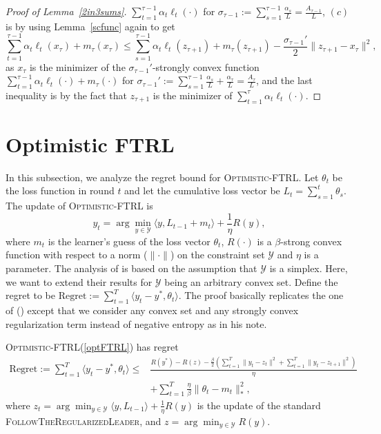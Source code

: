 \documentclass[pmlr]{jmlr} %
\def\FTRL{\textsc{FollowTheRegularizedLeader}\xspace}
\def\OFTRL{\textsc{Optimistic-FTRL}\xspace}
\newcommand{\YY}{\mathcal{Y}}
\begin{document}
\begin{proof}[Proof of Lemma~\ref{2in3sums}]
$\sum_{t=1}^{\tau-1}\alpha_{t} \ell_{t} (\cdot) $ for $\sigma_{\tau-1} := \sum_{s=1}^{\tau-1}\frac{\alpha_{s}}{L} = \frac{A_{\tau-1}}{L}$,
$(c)$ is by using Lemma~\ref{scfunc} again to get
\begin{equation}
 \sum_{t=1}^{\tau-1} \alpha_{t} \ell_{t} (x_{\tau}) + m_{\tau}(x_{\tau}) \leq  \sum_{s=1}^{\tau-1}\alpha_{t} \ell_{t} (z_{\tau+1}) +m_{\tau}(z_{\tau+1}) - \frac{\sigma_{\tau-1}'}{2} \| z_{\tau+1} - x_{\tau}\|^{2},
\end{equation}
as $x_{\tau}$ is the minimizer of the $\sigma_{\tau-1}'$-strongly convex function
$\sum_{t=1}^{\tau-1}\alpha_{t} \ell_{t} (\cdot) + m_{\tau}(\cdot)$ for $\sigma_{\tau-1}':= \sum_{s=1}^{\tau-1}\frac{\alpha_{s}}{L} + \frac{\alpha_{\tau}}{L}= \frac{A_{\tau}}{L}$,
and the last inequality is by the fact that $z_{\tau+1}$ is the minimizer of
$\sum_{t=1}^{\tau}\alpha_{t} \ell_{t} (\cdot) $.
\end{proof}



\section{Optimistic FTRL} \label{app:optFTRL}
In this subsection, we analyze the regret bound for \OFTRL.
Let $\theta_{t}$ be the loss function in round $t$ and let the cumulative loss vector be
$L_{t} = \sum_{s=1}^{t} \theta_{s}$.
The update of \OFTRL is
\begin{equation} \label{optFTRL}
y_{t}  = \arg \min_{y \in \YY} \langle y , L_{t-1} + m_{t} \rangle + \frac{1}{\eta} R(y),
\end{equation}
where 
$m_{t}$ is the learner's guess of the loss vector $\theta_{t}$,
$R(\cdot)$ is a $\beta$-strong convex function with respect to a norm ($\| \cdot \|$) on the constraint set $\YY$
and $\eta$ is a parameter. 
The analysis of \cite{SALS15} is based on the assumption that $\YY$ is a simplex.
Here, we want to extend their results for $\YY$ being an arbitrary convex set.
Define the regret to be $\text{Regret}:= \sum_{t=1}^{T} \langle y_{t} - y^{*}, \theta_{t} \rangle$.
The proof basically replicates the one of (\cite{HaipengLuo17}) except that we consider any convex set and any strongly convex regularization term instead of negative entropy as in his note.

\begin{theorem} \label{thm:oftrl}
\OFTRL (\ref{optFTRL}) has regret
\begin{equation} \label{opt-ftrl}
\begin{aligned}
\textstyle \text{Regret}:= \sum_{t=1}^{T} \langle y_{t} - y^{*}, \theta_{t} \rangle 
\leq & \textstyle \frac{  R(y^{*}) - R(z)  - \frac{\beta}{2} (\sum_{{t=1}}^{T} \| y_{t} - z_{t} \|^{2} + \sum_{{t=1}}^{T} \| y_{t} - z_{t+1} \|^{2})}{\eta} 
\\& \textstyle +\sum_{t=1}^{T} \frac{\eta}{\beta} \| \theta_{t} - m_{t} \|^{2}_{*} ,
\end{aligned}
\end{equation}
where $z_{t}= \arg\min_{y \in \YY} \langle y, L_{{t-1}} \rangle + \frac{1}{\eta} R(y)$ is the update of the standard \FTRL,
and $z = \arg\min_{y \in \YY} R(y)$.
\end{theorem}
\end{document}
